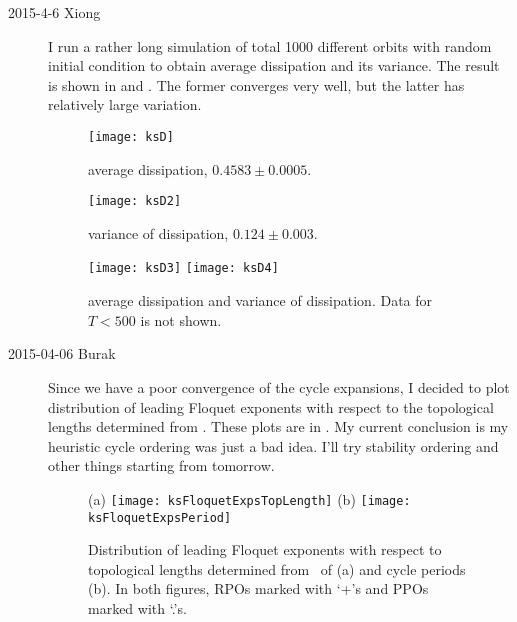 \begin{description}
\item[2015-4-6 Xiong] I run a rather long simulation of total 1000
different orbits with random initial condition to obtain
average dissipation and its variance. The result is shown
in  and . The former
converges very well, but the latter has relatively large
variation.

\begin{figure}[ht]
\begin{center}
  \texttt{[image: ksD]}
\end{center}
  \caption{average dissipation, $0.4583\pm 0.0005$.}
  \label{fig:averD}
\end{figure}
\begin{figure}[ht]
\begin{center}
  \texttt{[image: ksD2]}
\end{center}
  \caption{variance of dissipation, $0.124\pm 0.003$.}
  \label{fig:averD2}
\end{figure}
\begin{figure}[ht]
\begin{center}
  \texttt{[image: ksD3]}
  \texttt{[image: ksD4]}
\end{center}
  \caption{average dissipation and variance of dissipation. Data for $T < 500$
  is not shown.}
  \label{fig:averD3}
\end{figure}

\item[2015-04-06 Burak] Since we have a poor convergence of the cycle
expansions, I decided to plot distribution of leading Floquet exponents
with respect to the topological lengths determined from
. These plots are in . My
current conclusion is my heuristic cycle ordering was just a bad idea.
I'll try stability ordering and other things starting from tomorrow.

\begin{figure}[ht]
\begin{center}
    (a) \texttt{[image: ksFloquetExpsTopLength]}
    (b) \texttt{[image: ksFloquetExpsPeriod]}
\end{center}
    \caption[]{
        Distribution of leading Floquet exponents with respect to
        topological lengths determined from \PoincSec\ of
         (a) and cycle periods (b). In both figures,
        RPOs marked with `+'s and PPOs marked with `.'s.
    }
    \label{f-FloquetExps}
\end{figure}


\end{description}
